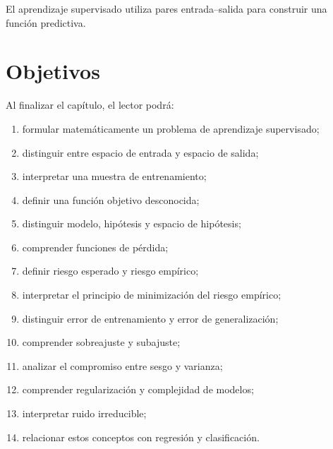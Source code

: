 \documentclass[
  spanish,
  10.5pt,
  letterpaper,
  DIV=11,
  numbers=noendperiod,
  oneside,
  open=any]{scrreprt}
\providecommand{\tightlist}{%
  \setlength{\itemsep}{0pt}\setlength{\parskip}{0pt}}
\theoremstyle{definition}
\theoremstyle{definition}
\theoremstyle{plain}
\theoremstyle{remark}
\begin{document}
\begin{tcolorbox}[enhanced jigsaw, arc=.35mm, bottomrule=.15mm, bottomtitle=1mm, breakable, colback=white, colbacktitle=quarto-callout-important-color!10!white, colframe=quarto-callout-important-color-frame, coltitle=black, left=2mm, leftrule=.75mm, opacityback=0, opacitybacktitle=0.6, rightrule=.15mm, title=\textcolor{quarto-callout-important-color}{\faExclamation}\hspace{0.5em}{Definición esencial}, titlerule=0mm, toprule=.15mm, toptitle=1mm]

El aprendizaje supervisado utiliza pares entrada--salida para construir
una función predictiva.

\end{tcolorbox}

\section*{Objetivos}\label{objetivos-4}


Al finalizar el capítulo, el lector podrá:

\begin{enumerate}
\def\labelenumi{\arabic{enumi}.}
\tightlist
\item
  formular matemáticamente un problema de aprendizaje supervisado;
\item
  distinguir entre espacio de entrada y espacio de salida;
\item
  interpretar una muestra de entrenamiento;
\item
  definir una función objetivo desconocida;
\item
  distinguir modelo, hipótesis y espacio de hipótesis;
\item
  comprender funciones de pérdida;
\item
  definir riesgo esperado y riesgo empírico;
\item
  interpretar el principio de minimización del riesgo empírico;
\item
  distinguir error de entrenamiento y error de generalización;
\item
  comprender sobreajuste y subajuste;
\item
  analizar el compromiso entre sesgo y varianza;
\item
  comprender regularización y complejidad de modelos;
\item
  interpretar ruido irreducible;
\item
  relacionar estos conceptos con regresión y clasificación.
\end{enumerate}
\end{document}

